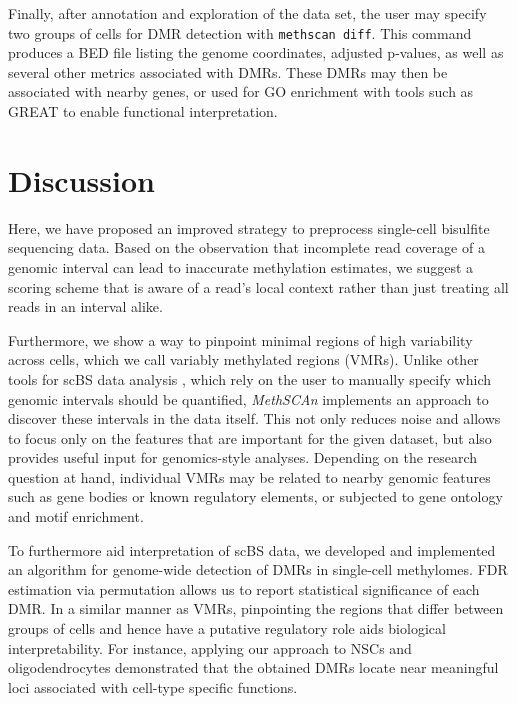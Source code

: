 \documentclass[10pt]{article}
\begin{document}
Finally, after annotation and exploration of the data set, the user may specify two groups of cells for DMR detection with \texttt{methscan diff}.
This command produces a BED file listing the genome coordinates, adjusted p-values, as well as several other metrics associated with DMRs.
These DMRs may then be associated with nearby genes, or used for GO enrichment with tools such as GREAT \citep{mclean2010great} to enable functional interpretation.


\section*{Discussion}

Here, we have proposed an improved strategy to preprocess single-cell bisulfite sequencing data.
Based on the observation that incomplete read coverage of a genomic interval can lead to inaccurate methylation estimates, we suggest a scoring scheme that is aware of a read's local context rather than just treating all reads in an interval alike. 

Furthermore, we show a way to pinpoint minimal regions of high variability across cells, which we call variably methylated regions (VMRs).
Unlike other tools for scBS data analysis \citep{kapourani2019melissa, kapourani2021scmet, danese2021episcanpy}, which rely on the user to manually specify which genomic intervals should be quantified, \textit{MethSCAn} implements an approach to discover these intervals in the data itself. This not only reduces noise and allows to focus only on the features that are important for the given dataset, but also provides useful input for genomics-style analyses.
Depending on the research question at hand, individual VMRs may be related to nearby genomic features such as gene bodies or known regulatory elements, or subjected to gene ontology and motif enrichment.

To furthermore aid interpretation of scBS data, we developed and implemented an algorithm for genome-wide detection of DMRs in single-cell methylomes.
FDR estimation via permutation allows us to report statistical significance of each DMR.
In a similar manner as VMRs, pinpointing the regions that differ between groups of cells and hence have a putative regulatory role aids biological interpretability.
For instance, applying our approach to NSCs and oligodendrocytes demonstrated that the obtained DMRs locate near meaningful loci associated with cell-type specific functions.
\end{document}
